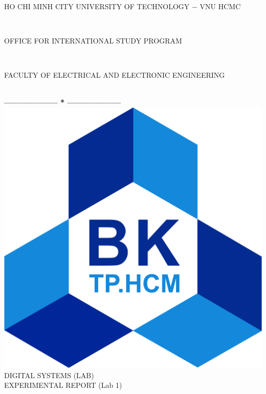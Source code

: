 \documentclass[13pt,a4paper]{report}
\begin{document}
\fontsize{13pt}{18pt}\selectfont
\begin{titlepage}
\thispagestyle{empty}
\thisfancypage{%
\setlength{\fboxsep}{0pt}%
\fbox}{} %
\

\begin{center}
\begin{large}
HO CHI MINH CITY UNIVERSITY OF TECHNOLOGY $-$ VNU HCMC
\end{large} \\
\begin{large}
OFFICE FOR INTERNATIONAL STUDY PROGRAM
\end{large} \\
\begin{large}
FACULTY OF ELECTRICAL AND ELECTRONIC ENGINEERING
\end{large} \\
\textbf{--------------------  *  --------------------}\\[4cm]
\includegraphics[scale=0.1]{logobk.png}\\[1cm]
{\fontsize{20pt}{1}\selectfont DIGITAL SYSTEMS (LAB)}\\
{\fontsize{20pt}{1}\selectfont EXPERIMENTAL REPORT (Lab 1)}\\[2.5cm]
\end{center}


\end{titlepage}
\end{document}
